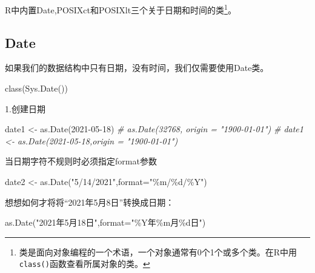 \documentclass[
]{book}
\newenvironment{Shaded}{\begin{snugshade}}{\end{snugshade}}
\newcommand{\AttributeTok}[1]{\textcolor[rgb]{0.77,0.63,0.00}{#1}}
\newcommand{\CommentTok}[1]{\textcolor[rgb]{0.56,0.35,0.01}{\textit{#1}}}
\newcommand{\FunctionTok}[1]{\textcolor[rgb]{0.00,0.00,0.00}{#1}}
\newcommand{\NormalTok}[1]{#1}
\newcommand{\OtherTok}[1]{\textcolor[rgb]{0.56,0.35,0.01}{#1}}
\newcommand{\StringTok}[1]{\textcolor[rgb]{0.31,0.60,0.02}{#1}}
\begin{document}
R中内置Date,POSIXct和POSIXlt三个关于日期和时间的类\footnote{类是面向对象编程的一个术语，一个对象通常有0个1个或多个类。在R中用\texttt{class()}函数查看所属对象的类。}。

\hypertarget{the-date-class}{%
\subsection{Date}\label{the-date-class}}

如果我们的数据结构中只有日期，没有时间，我们仅需要使用Date类。

\begin{Shaded}
\begin{Highlighting}[]
\FunctionTok{class}\NormalTok{(}\FunctionTok{Sys.Date}\NormalTok{())}
\end{Highlighting}
\end{Shaded}

1.创建日期

\begin{Shaded}
\begin{Highlighting}[]
\NormalTok{date1 }\OtherTok{\textless{}{-}} \FunctionTok{as.Date}\NormalTok{(}\StringTok{\textquotesingle{}2021{-}05{-}18\textquotesingle{}}\NormalTok{)}
\CommentTok{\# as.Date(32768, origin = "1900{-}01{-}01")}
\CommentTok{\# date1 \textless{}{-} as.Date(\textquotesingle{}2021{-}05{-}18\textquotesingle{},origin = "1900{-}01{-}01")}
\end{Highlighting}
\end{Shaded}

当日期字符不规则时必须指定format参数

\begin{Shaded}
\begin{Highlighting}[]
\NormalTok{date2 }\OtherTok{\textless{}{-}} \FunctionTok{as.Date}\NormalTok{(}\StringTok{"5/14/2021"}\NormalTok{,}\AttributeTok{format=}\StringTok{"\%m/\%d/\%Y"}\NormalTok{)}
\end{Highlighting}
\end{Shaded}

想想如何才将将``2021年5月8日''转换成日期：

\begin{Shaded}
\begin{Highlighting}[]
\FunctionTok{as.Date}\NormalTok{(}\StringTok{"2021年5月18日"}\NormalTok{,}\AttributeTok{format=}\StringTok{"\%Y年\%m月\%d日"}\NormalTok{)}
\end{Highlighting}
\end{Shaded}
\end{document}
